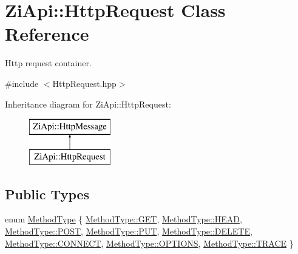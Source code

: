 \hypertarget{classZiApi_1_1HttpRequest}{}\section{Zi\+Api\+::Http\+Request Class Reference}
\label{classZiApi_1_1HttpRequest}


Http request container.  




{\ttfamily \#include $<$Http\+Request.\+hpp$>$}

Inheritance diagram for Zi\+Api\+::Http\+Request\+:\begin{figure}[H]
\begin{center}
\leavevmode
\includegraphics[height=2.000000cm]{classZiApi_1_1HttpRequest}
\end{center}
\end{figure}
\subsection*{Public Types}
\begin{DoxyCompactItemize}
\item 
enum \mbox{\hyperlink{classZiApi_1_1HttpRequest_a8592cff867cbbc5cc43bd3a4d6053a1b}{Method\+Type}} \{ \newline
\mbox{\hyperlink{classZiApi_1_1HttpRequest_a8592cff867cbbc5cc43bd3a4d6053a1ba7528035a93ee69cedb1dbddb2f0bfcc8}{Method\+Type\+::\+G\+ET}}, 
\mbox{\hyperlink{classZiApi_1_1HttpRequest_a8592cff867cbbc5cc43bd3a4d6053a1bae15e216fc1c639f787b1231ecdfa1bf8}{Method\+Type\+::\+H\+E\+AD}}, 
\mbox{\hyperlink{classZiApi_1_1HttpRequest_a8592cff867cbbc5cc43bd3a4d6053a1baa02439ec229d8be0e74b0c1602392310}{Method\+Type\+::\+P\+O\+ST}}, 
\mbox{\hyperlink{classZiApi_1_1HttpRequest_a8592cff867cbbc5cc43bd3a4d6053a1ba3e75383a5992a6d15fb81e872e46e256}{Method\+Type\+::\+P\+UT}}, 
\newline
\mbox{\hyperlink{classZiApi_1_1HttpRequest_a8592cff867cbbc5cc43bd3a4d6053a1ba32f68a60cef40faedbc6af20298c1a1e}{Method\+Type\+::\+D\+E\+L\+E\+TE}}, 
\mbox{\hyperlink{classZiApi_1_1HttpRequest_a8592cff867cbbc5cc43bd3a4d6053a1bab57e2519e26151feacdbe52076bc39ec}{Method\+Type\+::\+C\+O\+N\+N\+E\+CT}}, 
\mbox{\hyperlink{classZiApi_1_1HttpRequest_a8592cff867cbbc5cc43bd3a4d6053a1ba164dd62adb30ca051b5289672a572f9b}{Method\+Type\+::\+O\+P\+T\+I\+O\+NS}}, 
\mbox{\hyperlink{classZiApi_1_1HttpRequest_a8592cff867cbbc5cc43bd3a4d6053a1ba2d3e4144aa384b18849ab9a8abad74d6}{Method\+Type\+::\+T\+R\+A\+CE}}
 \}
\end{DoxyCompactItemize}
